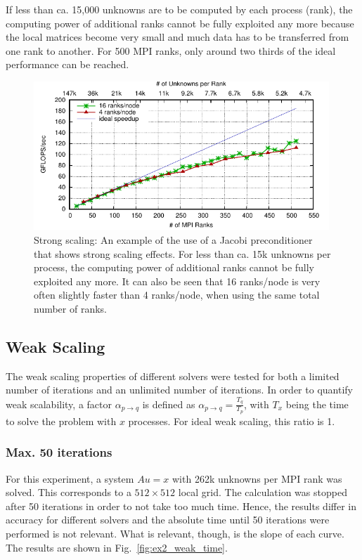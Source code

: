 If less than ca. 15,000 unknowns are to be computed by each process (rank), the computing power of additional ranks cannot be fully exploited any more because the local matrices become very small and much data has to be transferred from one rank to another. For 500 MPI ranks, only around two thirds of the ideal performance can be reached. 


\begin{figure}[tb]
	\centering
	\includegraphics[width=0.99\textwidth]{ex48}
	\caption{Strong scaling: An example of the use of a Jacobi preconditioner that shows strong scaling effects. For less than ca. 15k unknowns per process, the computing power of additional ranks cannot be fully exploited any more. It can also be seen that 16 ranks/node is very often slightly faster than 4 ranks/node, when using the same total number of ranks.} 
	\label{fig:res_ex48}
\end{figure}



\subsection{Weak Scaling}

The weak scaling properties of different solvers were tested for both a limited number of iterations and an unlimited number of iterations. In order to quantify weak scalability, a factor $\alpha_{p \rightarrow q}$ is defined as $\alpha_{p \rightarrow q} = \frac{T_q}{T_p}$, with $T_x$ being the time to solve the problem with $x$ processes. For ideal weak scaling, this ratio is 1. 

\subsubsection*{Max. 50 iterations}

For this experiment, a system $Au = x$ with 262k unknowns per MPI rank was solved. This corresponds to a $512 \times 512$ local grid. The calculation was stopped after 50 iterations in order to not take too much time. Hence, the results differ in accuracy for different solvers and the absolute time until 50 iterations were performed is not relevant. What is relevant, though, is the slope of each curve. The results are shown in Fig.~\ref{fig:ex2_weak_time}. 

